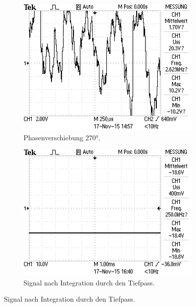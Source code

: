 \begin{figure}
\begin{subfigure}{0.48\textwidth}
   \includegraphics[width=\textwidth]{bilder/Mit Rauschen/5.JPG}
 \caption{Phasenverschiebung 270°.}
   \label{fig:5}
 \end{subfigure}
 \begin{subfigure}{0.48\textwidth}
   \centering
   \includegraphics[width=\textwidth]{bilder/Mit Rauschen/6.JPG}
 \caption{Signal nach Integration durch den Tiefpass.}
   \label{fig:6}
 \end{subfigure}
\end{figure}

